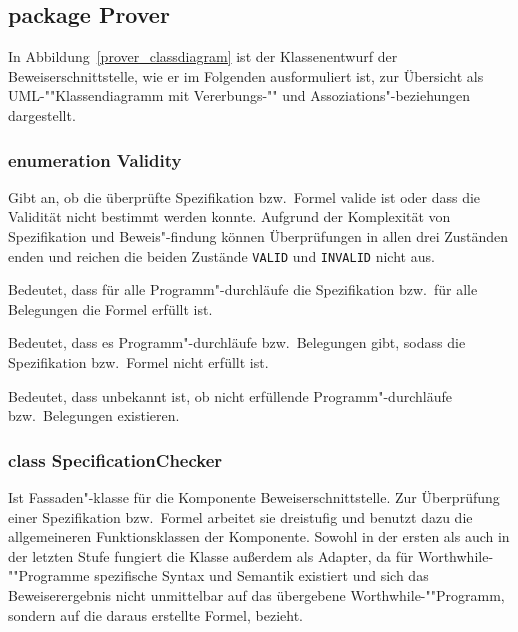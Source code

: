 \subsection{package Prover}%

In Abbildung~\ref{prover_classdiagram} ist der Klassenentwurf der
Beweiserschnittstelle, wie er im Folgenden ausformuliert ist, zur
Übersicht als UML-""Klassendiagramm mit Vererbungs-"" und
Assoziations"-beziehungen dargestellt.%

\subsubsection{enumeration Validity}%

Gibt an, ob die überprüfte Spezifikation bzw.\ Formel valide ist oder
dass die Validität nicht bestimmt werden konnte. Aufgrund der
Komplexität von Spezifikation und Beweis"-findung können Überprüfungen
in allen drei Zuständen enden und reichen die beiden Zustände
\texttt{VALID} und \texttt{INVALID} nicht aus.%

\begin{description}%

    Bedeutet, dass für alle Programm"-durchläufe die Spezifikation
    bzw.\ für alle Belegungen die Formel erfüllt ist.%


    Bedeutet, dass es Programm"-durchläufe bzw.\ Belegungen gibt,
    sodass die Spezifikation bzw.\ Formel nicht erfüllt ist.%


    Bedeutet, dass unbekannt ist, ob nicht erfüllende
    Programm"-durchläufe bzw.\ Belegungen existieren.%

\end{description}%

\subsubsection{class SpecificationChecker}%

Ist Fassaden"-klasse für die Komponente Beweiserschnittstelle. Zur
Überprüfung einer Spezifikation bzw.\ Formel arbeitet sie dreistufig
und benutzt dazu die allgemeineren Funktionsklassen der Komponente.
Sowohl in der ersten als auch in der letzten Stufe fungiert die Klasse
außerdem als Adapter, da für Worthwhile-""Programme spezifische Syntax
und Semantik existiert und sich das Beweiserergebnis nicht unmittelbar
auf das übergebene Worthwhile-""Programm, sondern auf die daraus
erstellte Formel, bezieht.%

